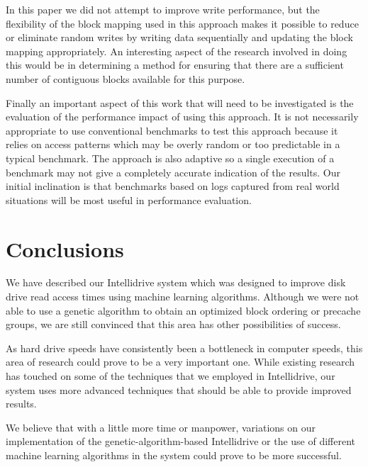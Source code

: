 \documentclass[letterpaper,twocolumn,10pt]{article}
\begin{document}
In this paper we did not attempt to improve write performance, but the flexibility of the block mapping used in this approach makes it possible to reduce or eliminate random writes by writing data sequentially and updating the block mapping appropriately.  An interesting aspect of the research involved in doing this would be in determining a method for ensuring that there are a sufficient number of contiguous blocks available for this purpose.

Finally an important aspect of this work that will need to be investigated is the evaluation of the performance impact of using this approach.  It is not necessarily appropriate to use conventional benchmarks to test this approach because it relies on access patterns which may be overly random or too predictable in a typical benchmark.  The approach is also adaptive so a single execution of a benchmark may not give a completely accurate indication of the results.  Our initial inclination is that benchmarks based on logs captured from real world situations will be most useful in performance evaluation.

\section{Conclusions}
We have described our Intellidrive system which was designed to improve disk drive read access times using machine learning algorithms. Although we were not able to use a genetic algorithm to obtain an optimized block ordering or precache groups, we are still convinced that this area has other possibilities of success.  

As hard drive speeds have consistently been a bottleneck in computer speeds, this area of research could prove to be a very important one.  While existing research has touched on some of the techniques that we employed in Intellidrive, our system uses more advanced techniques that should be able to provide improved results.

We believe that with a little more time or manpower, variations on our implementation of the genetic-algorithm-based Intellidrive or the use of different machine learning algorithms in the system could prove to be more successful.

{\footnotesize 
}
\end{document}
